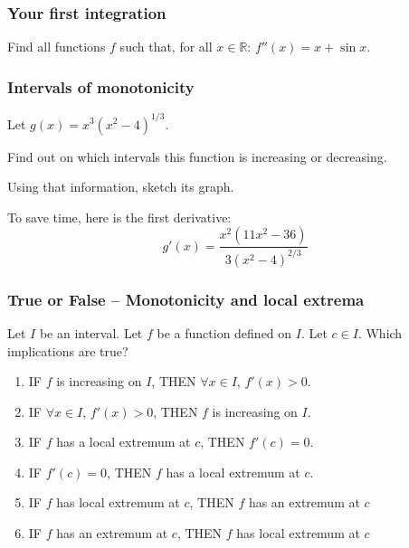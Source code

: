 \begin{frame}[t]
	\frametitle{Your first integration}

	Find all functions $f$ such that, for all $\displaystyle x \in \mathbb{R}$:
	$\displaystyle f''(x) = x + \sin x$.
\end{frame}

\begin{frame}
	\frametitle{Intervals of monotonicity}

	Let $\displaystyle g(x) = x^{3}(x^{2}-4)^{1/3}.$

	Find out on which intervals this function is increasing or decreasing.

	Using that information, sketch its graph.

	To save time, here is the first derivative:
	\[
		g'(x) = \frac{x^{2}(11x^{2}-36)}{3(x^{2}-4)^{2/3}}
	\]
\end{frame}

\begin{frame}[t]
	\fontsize{13}{13}\selectfont
	\frametitle{True or False -- Monotonicity and local extrema}

	Let $I$ be an interval. Let $f$ be a function defined on $I$. Let $c \in I$.
	Which implications are true?

	\begin{enumerate}
		\item IF {\color{red} $f$ is increasing on $I$}, \quad THEN
			{\color{blue} $\forall x \in I$, $f'(x) >0$}.

		\item IF {\color{blue} $\forall x \in I$, $f'(x) >0$}, \quad THEN
			{\color{red} $f$ is increasing on $I$}.

		\item IF {\color{rosa} $f$ has a local extremum at $c$}, \quad THEN
			{\color{naranja} $f'(c)=0$}.

		\item IF {\color{naranja} $f'(c)=0$}, \quad THEN
			{\color{rosa} $f$ has a local extremum at $c$}.

		\item IF {\color{rosa} $f$ has local extremum at $c$}, \; THEN
			{\color{verde} $f$ has an extremum at $c$}

		\item IF {\color{verde} $f$ has an extremum at $c$}, \; THEN
			{\color{rosa} $f$ has local extremum at $c$}
	\end{enumerate}
\end{frame}

